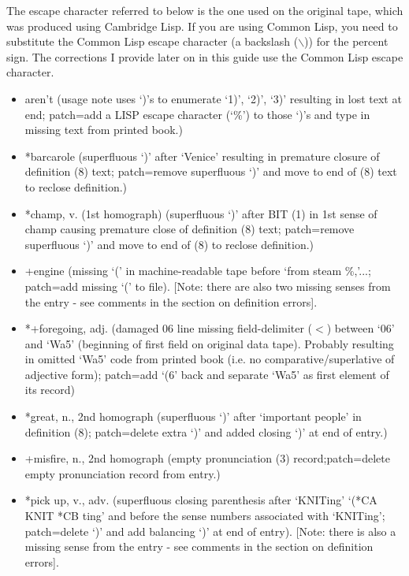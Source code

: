 The escape character referred to below is the one used on the original tape, 
which was produced using Cambridge Lisp.  If you are using Common	
Lisp, you need to substitute the Common Lisp escape character (a backslash ($\backslash$))
for the percent sign.  The corrections I provide later on in this guide
use the Common Lisp escape character.

\begin{itemize}

\item aren't (usage note uses `)'s to enumerate `1)', `2)', `3)' resulting
	in lost text at end; patch=add a LISP escape character (`\%') to those `)'s
	and type in missing text from printed book.)

\item *barcarole (superfluous `)' after `Venice' resulting in premature closure
	of definition (8) text; patch=remove superfluous `)' and
	move to end of (8) text to reclose definition.)

\item *champ, v. (1st homograph) (superfluous `)' after BIT (1) in 1st sense
	of champ causing premature close of definition (8) text;
	patch=remove superfluous `)' and move to end of (8) to
	reclose definition.)

\item +engine (missing `(' in machine-readable tape before `from steam \%,'...;
	patch=add missing `(' to file).  [Note: there are also two missing senses
        from the entry - see comments in the section on definition errors].

\item *+foregoing, adj. (damaged 06 line missing field-delimiter ($<$) between
	`06' and `Wa5' (beginning of first field on original data tape).
	Probably resulting in omitted `Wa5' code from printed book
	(i.e. no comparative/superlative of adjective form); patch=add
	`(6' back and separate `Wa5' as first element of its record)

\item *great, n., 2nd homograph (superfluous `)' after `important people'
	in definition (8); patch=delete extra `)' and added closing
	`)' at end of entry.)

\item +misfire, n., 2nd homograph (empty pronunciation (3) record;patch=delete
	empty pronunciation record from entry.)

\item *pick up, v., adv. (superfluous closing parenthesis after `KNITing'
	`(*CA KNIT *CB ting' and before the sense numbers associated
	with `KNITing'; patch=delete `)' and add balancing `)' at
	end of entry).  [Note: there is also a missing sense from the entry -
        see comments in the section on definition errors].


\end{itemize}
